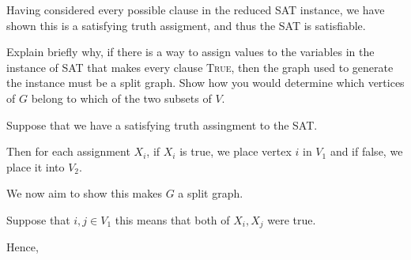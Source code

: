 \begin{questions}
\begin{soln}
		Having considered every possible clause in the reduced SAT instance, we have shown this is a satisfying truth assigment, and thus the SAT is satisfiable.

	\end{soln}

	\ifsolutions\fi

	\question[3] Explain briefly why,  if there is a way to assign values  to the variables in the
	instance of SAT that  makes every clause \textsc{True}, then the  graph used to generate
	the instance must be  a split graph. Show how you would determine  which vertices of $G$
	belong to which of the two subsets of $V$.

	\begin{soln}
		Suppose that we have a satisfying truth assingment to the SAT.

		Then for each assignment \(X_i\), if \(X_i\) is true, we place vertex \(i\) in \(V_1\) and if false, we place it into \(V_2\).

		We now aim to show this makes \(G\) a split graph.

		Suppose that \(i, j \in V_1\) this means that both of \(X_i, X_j\) were true.

		Hence,


	\end{soln}

	\ifsolutions\fi
\end{questions}

